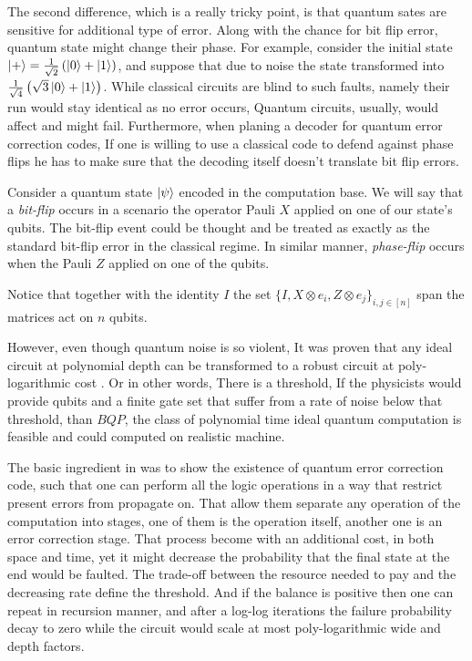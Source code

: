The second difference, which is a really tricky point, is that quantum sates are sensitive for additional type of error. Along with the chance for bit flip error, quantum state might change their phase. For example, consider the initial state $\ket{+} = \frac{1}{\sqrt{2}}\left( \ket{0} + \ket{1} \right)$, and suppose that due to noise the state transformed into $\frac{1}{\sqrt{4}}\left( \sqrt{3}\ket{0} + \ket{1} \right)$. While classical circuits are blind to such faults, namely their run would stay identical as no error occurs, Quantum circuits, usually, would affect and might fail. Furthermore, when planing a decoder for quantum error correction codes, If one is willing to use a classical code to defend against phase flips he has to make sure that the decoding itself doesn't translate bit flip errors. 
\begin{definition} \label{def:bphf}  
  Consider a quantum state $\ket{\psi}$ encoded in the computation base. We will say that a \textit{bit-flip} occurs in a scenario the operator Pauli $X$ applied on one of our state's qubits. The bit-flip event could be thought and be treated as exactly as the standard bit-flip error in the classical regime. In similar manner, \textit{phase-flip} occurs when the Pauli $Z$ applied on one of the qubits. 

  Notice that together with the identity $I$ the set $\{I, X \otimes e_{i} , Z \otimes e_{j} \}_{i,j \in [n]}$ span the matrices act on $n$ qubits.  
\end{definition}

However, even though quantum noise is so violent, It was proven that any ideal circuit at polynomial depth can be transformed to a robust circuit at poly-logarithmic cost \cite{aharonov1999faulttolerant}. Or in other words, There is a threshold, If the physicists would provide qubits and a finite gate set that suffer from a rate of noise below that threshold, than $BQP$, the class of polynomial time ideal quantum computation is feasible and could computed on realistic machine.                

The basic ingredient in \cite{aharonov1999faulttolerant} was to show the existence of quantum error correction code, such that one can perform all the logic operations in a way that restrict present errors from propagate on. That allow them separate any operation of the computation into stages, one of them is the operation itself, another one is an error correction stage. That process become with an additional cost, in both space and time, yet it might decrease the probability that the final state at the end would be faulted. The trade-off between the resource needed to pay and the decreasing rate define the threshold. And if the balance is positive then one can repeat in recursion manner, and after a log-log iterations the failure probability decay to zero while the circuit would scale at most poly-logarithmic wide and depth factors.      
 
